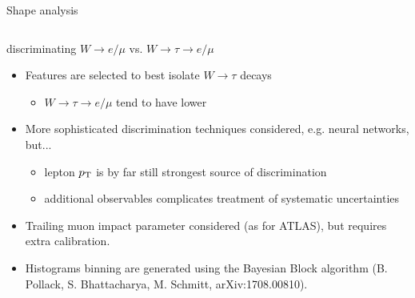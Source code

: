 \begin{frame}{Shape analysis}
\smaller 
    \begin{columns}
        \begin{block}{\smaller discriminating $W\rightarrow e/\mu$ vs. $W\rightarrow\tau\rightarrow e/\mu$}
            \begin{itemize}
                \item Features are selected to best isolate
                    $W\rightarrow\tau$ decays 
                \begin{itemize}
                \smaller
                    \item \alert{$W\rightarrow\tau\rightarrow e/\mu$ tend to have lower \pt}
                \end{itemize}
                \item More sophisticated discrimination techniques considered, e.g.
                    neural networks, but...
                \begin{itemize}
                \smaller
                    \item lepton $p_{\mathrm{T}}$ is by far still strongest source of discrimination
                    \item additional observables complicates treatment of systematic uncertainties
                \end{itemize}
                \item Trailing muon impact parameter considered (as for ATLAS), but requires extra calibration.
                \item Histograms binning are generated using the Bayesian Block algorithm \tiny{(B. Pollack, S. Bhattacharya, M. Schmitt, arXiv:1708.00810)}. 
            \end{itemize}

        \end{block}



\end{columns}
\end{frame}

